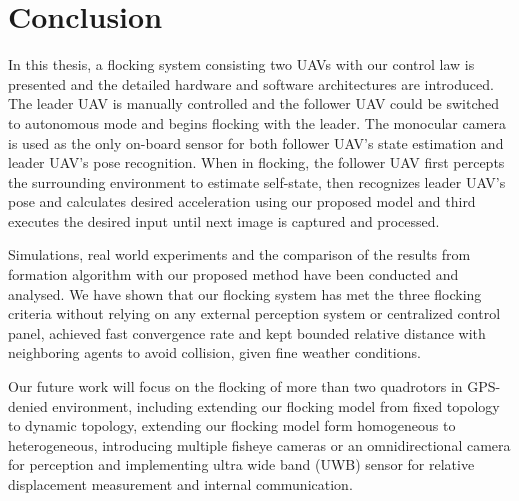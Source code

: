 \chapter{Conclusion}\label{conclusion}

In this thesis, a flocking system consisting two UAVs with our control law is presented and the detailed hardware and software architectures are introduced. The leader UAV is manually controlled and the follower UAV could be switched to autonomous mode and begins flocking with the leader. The monocular camera is used as the only on-board sensor for both follower UAV's state estimation and leader UAV's pose recognition. When in flocking, the follower UAV first percepts the surrounding environment to estimate self-state, then recognizes leader UAV's pose and calculates desired acceleration using our proposed model and third executes the desired input until next image is captured and processed.

Simulations, real world experiments and the comparison of the results from formation algorithm with our proposed method have been conducted and analysed. We have shown that our flocking system has met the three flocking criteria without relying on any external perception system or centralized control panel, achieved fast convergence rate and kept bounded relative distance with neighboring agents to avoid collision, given fine weather conditions.

Our future work will focus on the flocking of more than two quadrotors in GPS-denied environment, including extending our flocking model from fixed topology to dynamic topology, extending our flocking model form homogeneous to heterogeneous, introducing multiple fisheye cameras or an omnidirectional camera for perception and implementing ultra wide band (UWB) sensor for relative displacement measurement and internal communication.

